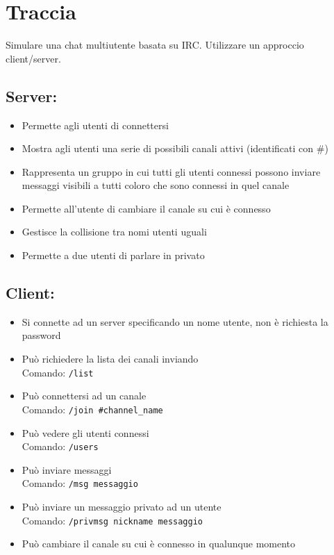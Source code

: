 \section{Traccia}
\justify

Simulare una chat multiutente basata su IRC. Utilizzare un approccio client/server.
\subsection*{Server:}
\begin{itemize}
    \item Permette agli utenti di connettersi
    \item Mostra agli utenti una serie di possibili canali attivi (identificati con \#)
    \item Rappresenta un gruppo in cui tutti gli utenti connessi possono inviare messaggi visibili a tutti coloro che sono connessi in quel canale
    \item Permette all'utente di cambiare il canale su cui è connesso
    \item Gestisce la collisione tra nomi utenti uguali
    \item Permette a due utenti di parlare in privato
\end{itemize}

\subsection*{Client:}
\begin{itemize}
    \item Si connette ad un server specificando un nome utente, non è richiesta la password
    \item Può richiedere la lista dei canali inviando \\
    Comando: \texttt{/list}
    \item Può connettersi ad un canale \\
    Comando: \texttt{/join \#channel\_name}
    \item Può vedere gli utenti connessi \\
    Comando: \texttt{/users}
    \item Può inviare messaggi \\
    Comando: \texttt{/msg messaggio}
    \item Può inviare un messaggio privato ad un utente \\
    Comando: \texttt{/privmsg nickname messaggio}
    \item Può cambiare il canale su cui è connesso in qualunque momento
\end{itemize}

